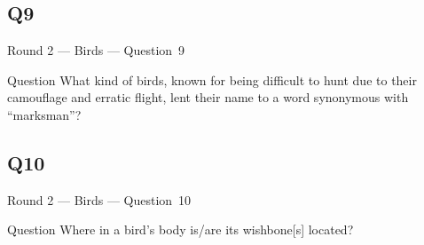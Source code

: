 \documentclass[11pt]{beamer}
\begin{document}
\subsection*{Q9}
\begin{frame}[t]{Round 2 --- Birds --- \mbox{Question 9}}
    \vspace{-0.5em}
    \begin{block}{Question}
        What kind of birds, known for being difficult to hunt due to their camouflage and erratic flight, lent their name to a word synonymous with ``marksman''?
    \end{block}
\end{frame}
\subsection*{Q10}
\begin{frame}[t]{Round 2 --- Birds --- \mbox{Question 10}}
    \vspace{-0.5em}
    \begin{block}{Question}
        Where in a bird's body is/are its wishbone[s] located?
    \end{block}
\end{frame}
\end{document}
